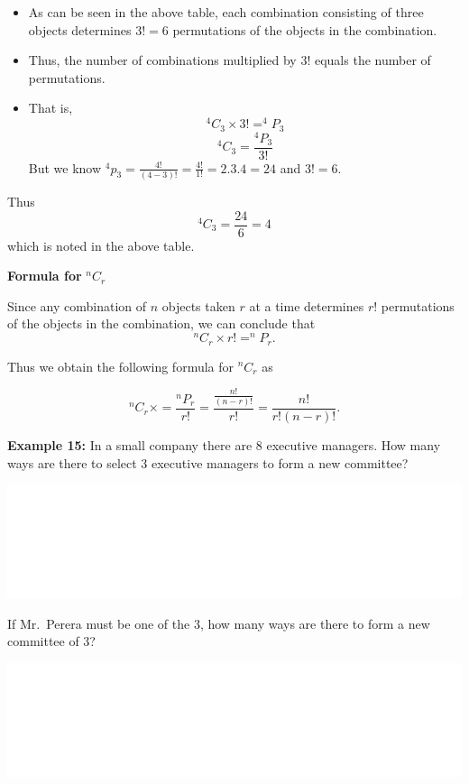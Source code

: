\documentclass[]{book}
\providecommand{\tightlist}{%
  \setlength{\itemsep}{0pt}\setlength{\parskip}{0pt}}
\begin{document}
\begin{itemize}
\tightlist
\item
  As can be seen in the above table, each combination consisting of three objects determines \(3! = 6\) permutations of the objects in the combination.
\item
  Thus, the number of combinations multiplied by \(3!\) equals the number of permutations.
\item
  That is,
  \[^4C_3\times 3! = ^4P_3\]
  \[^4C_3 = \frac{^4P_3}{3!}\]
  But we know \(^4p_3 = \frac{4!}{(4-3)!}=\frac{4!}{1!} = 2.3.4 = 24\) and \(3!=6\).
\end{itemize}

Thus
\[^4C_3 = \frac{24}{6} = 4\]
which is noted in the above table.

\textbf{Formula for} \(^nC_r\)

Since any combination of \(n\) objects taken \(r\) at a time determines \(r!\) permutations of the objects in the combination, we can conclude that
\[^nC_r\times r! = ^nP_r.\]

Thus we obtain the following formula for \(^nC_r\) as

\[^nC_r\times = \frac{^nP_r}{r!} = \frac{\frac{n!}{(n-r)!}}{r!} = \frac{n!}{r!(n-r)!}.\]

\textbf{Example 15:} In a small company there are 8 executive managers. How many ways are there to select 3 executive managers to form a new committee?

\begin{center}\includegraphics[width=1\linewidth]{figure/box891-1} \end{center}

If Mr.~Perera must be one of the 3, how many ways are there to form a new committee of 3?

\begin{center}\includegraphics[width=1\linewidth]{figure/box891a-1} \end{center}
\end{document}
